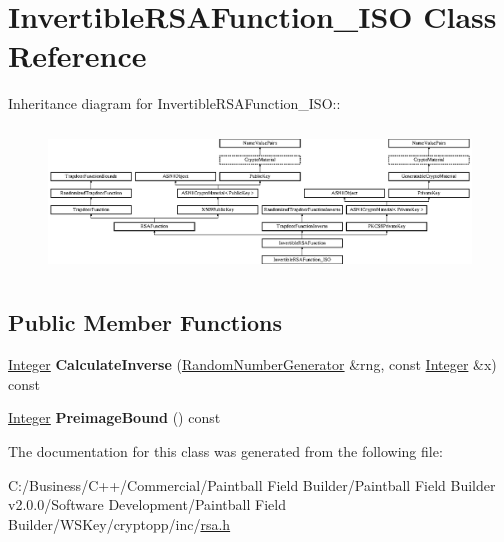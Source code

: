 \hypertarget{class_invertible_r_s_a_function___i_s_o}{
\section{InvertibleRSAFunction\_\-ISO Class Reference}
\label{class_invertible_r_s_a_function___i_s_o}
}
Inheritance diagram for InvertibleRSAFunction\_\-ISO::\begin{figure}[H]
\begin{center}
\leavevmode
\includegraphics[height=3.87879cm]{class_invertible_r_s_a_function___i_s_o}
\end{center}
\end{figure}
\subsection*{Public Member Functions}
\begin{DoxyCompactItemize}
\item 
\hypertarget{class_invertible_r_s_a_function___i_s_o_ac5e8e542add1e671faa8619923f14312}{
\hyperlink{class_integer}{Integer} {\bfseries CalculateInverse} (\hyperlink{class_random_number_generator}{RandomNumberGenerator} \&rng, const \hyperlink{class_integer}{Integer} \&x) const }
\label{class_invertible_r_s_a_function___i_s_o_ac5e8e542add1e671faa8619923f14312}

\item 
\hypertarget{class_invertible_r_s_a_function___i_s_o_a64f467c983e1117223e754a82860ebc7}{
\hyperlink{class_integer}{Integer} {\bfseries PreimageBound} () const }
\label{class_invertible_r_s_a_function___i_s_o_a64f467c983e1117223e754a82860ebc7}

\end{DoxyCompactItemize}


The documentation for this class was generated from the following file:\begin{DoxyCompactItemize}
\item 
C:/Business/C++/Commercial/Paintball Field Builder/Paintball Field Builder v2.0.0/Software Development/Paintball Field Builder/WSKey/cryptopp/inc/\hyperlink{rsa_8h}{rsa.h}\end{DoxyCompactItemize}
